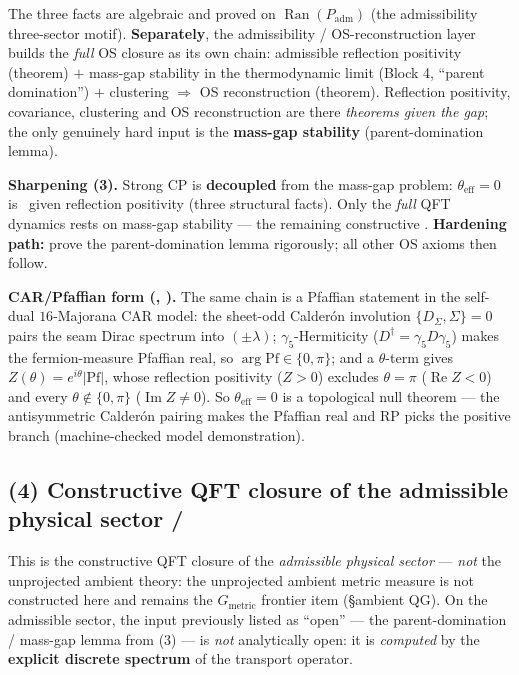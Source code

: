 \documentclass[11pt,a4paper]{article}
\theoremstyle{definition}
\begin{document}
\noindent The three facts are algebraic and proved on $\operatorname{Ran}(P_{\mathrm{adm}})$ (the
admissibility three-sector motif). \textbf{Separately}, the admissibility / OS-reconstruction layer builds the \emph{full} OS
closure as its own chain: admissible reflection positivity (theorem) $+$ mass-gap stability in the
thermodynamic limit (Block 4, ``parent domination'') $+$ clustering $\Rightarrow$ OS reconstruction
(theorem). Reflection positivity, covariance, clustering and OS reconstruction are there \emph{theorems
given the gap}; the only genuinely hard input is the \textbf{mass-gap stability} (parent-domination
lemma).

\par\smallskip\noindent\textbf{Sharpening (3).}
Strong CP is \textbf{decoupled} from the mass-gap problem: $\theta_{\mathrm{eff}}=0$ is \mE\ given
reflection positivity (three structural facts). Only the \emph{full} QFT dynamics rests on mass-gap
stability --- the remaining constructive \mC. \textbf{Hardening path:} prove the parent-domination
lemma rigorously; all other OS axioms then follow.

\par\smallskip\noindent\textbf{CAR/Pfaffian form (, \mE).} The same chain
is a Pfaffian statement in the self-dual $16$-Majorana CAR model: the sheet-odd Calder\'on involution
$\{D_\Sigma,\Sigma\}=0$ pairs the seam Dirac spectrum into $(\pm\lambda)$; $\gamma_5$-Hermiticity
($D^\dagger=\gamma_5 D\gamma_5$) makes the fermion-measure Pfaffian real, so $\arg\mathrm{Pf}\in\{0,\pi\}$;
and a $\theta$-term gives $Z(\theta)=e^{i\theta}|\mathrm{Pf}|$, whose reflection positivity ($Z>0$)
excludes $\theta=\pi$ ($\operatorname{Re}Z<0$) and every $\theta\notin\{0,\pi\}$ ($\operatorname{Im}Z\neq0$).
So $\theta_{\mathrm{eff}}=0$ is a topological null theorem --- the antisymmetric Calder\'on pairing makes
the Pfaffian real and RP picks the positive branch (machine-checked model demonstration).

\subsection*{(4) Constructive QFT closure of the admissible physical sector \mE/\mC}
This is the constructive QFT closure of the \emph{admissible physical sector} --- \emph{not} the
unprojected ambient theory: the unprojected ambient metric measure is not constructed here and remains the
$G_{\mathrm{metric}}$ frontier item (\S ambient QG). On the admissible sector, the input previously listed
as ``open'' --- the parent-domination / mass-gap lemma from (3) --- is \emph{not} analytically open: it is
\emph{computed} by the \textbf{explicit discrete spectrum} of the transport operator.
\end{document}

